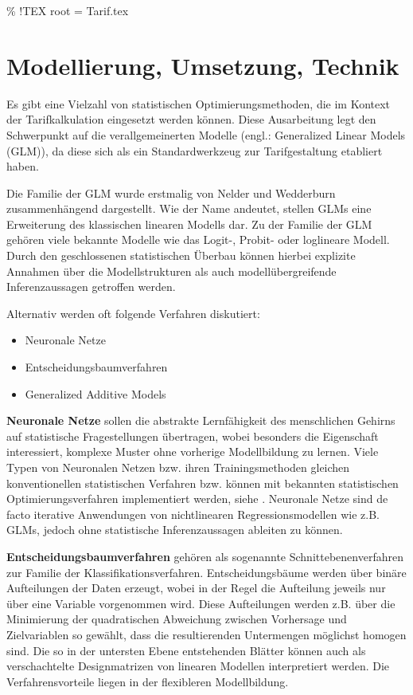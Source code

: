 \% !TEX root = Tarif.tex
\chapter{Modellierung, Umsetzung, Technik} \label{technik}

Es gibt eine Vielzahl von statistischen Optimierungsmethoden, die im Kontext der Tarifkalkulation eingesetzt werden können. Diese Ausarbeitung legt den Schwerpunkt auf die verallgemeinerten Modelle (engl.: Generalized Linear Models (GLM)), da diese sich als ein Standardwerkzeug zur Tarifgestaltung etabliert haben.

Die Familie der GLM  wurde erstmalig von Nelder und Wedderburn \cite{Nelder} zusammenhängend dargestellt. Wie der Name andeutet, stellen GLMs eine Erweiterung des klassischen linearen Modells dar. Zu der Familie der GLM gehören viele bekannte Modelle wie das Logit-, Probit- oder loglineare Modell. Durch den geschlossenen statistischen Überbau können hierbei explizite Annahmen über die Modellstrukturen als auch modellübergreifende Inferenzaussagen getroffen werden.

Alternativ werden oft folgende Verfahren diskutiert:

\begin{itemize}
\item Neuronale Netze
\item Entscheidungsbaumverfahren
\item Generalized Additive Models
\end{itemize}

\textbf{Neuronale Netze} sollen die abstrakte Lernfähigkeit des menschlichen Gehirns auf statistische Fragestellungen übertragen, wobei besonders die Eigenschaft interessiert, komplexe Muster ohne vorherige Modellbildung zu lernen.
Viele Typen von Neuronalen Netzen bzw. ihren Trainingsmethoden gleichen konventionellen statistischen Verfahren bzw. können mit bekannten statistischen Optimierungsverfahren implementiert werden, siehe \cite{Sarle}. Neuronale Netze sind de facto iterative Anwendungen von nichtlinearen Regressionsmodellen wie z.B. GLMs, jedoch ohne statistische Inferenzaussagen ableiten zu können.

\textbf{Entscheidungsbaumverfahren} gehören als sogenannte Schnittebenenverfahren zur Familie der Klassifikationsverfahren. Entscheidungsbäume werden über binäre Aufteilungen der Daten erzeugt, wobei in der Regel die Aufteilung jeweils nur über eine Variable vorgenommen wird. Diese Aufteilungen werden z.B. über die Minimierung der quadratischen Abweichung zwischen Vorhersage und Zielvariablen so gewählt, dass die resultierenden Untermengen möglichst homogen sind.
Die so in der untersten Ebene entstehenden Blätter können auch als verschachtelte Designmatrizen von linearen Modellen interpretiert werden. Die Verfahrensvorteile liegen in der flexibleren Modellbildung.

